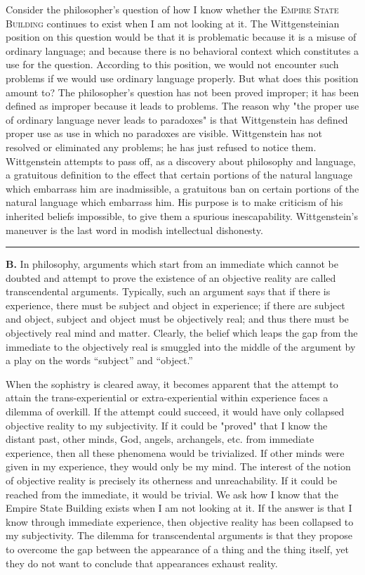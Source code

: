 \documentclass[10pt,twoside,draft]{memoir}
\newcommand{\gap}{\plainbreak{2}}
\begin{document}
Consider the philosopher's question of how I know whether the \textsc{Empire 
State Building} continues to exist when I am not looking at it. The 
Wittgensteinian position on this question would be that it is problematic 
because it is a misuse of ordinary language; and because there is no 
behavioral context which constitutes a use for the question. According to 
this position, we would not encounter such problems if we would use 
ordinary language properly. But what does this position amount to? The 
philosopher's question has not been proved improper; it has been defined as 
improper because it leads to problems. The reason why "the proper use of 
ordinary language never leads to paradoxes" is that Wittgenstein has defined 
proper use as use in which no paradoxes are visible. Wittgenstein has not 
resolved or eliminated any problems; he has just refused to notice them. 
Wittgenstein attempts to pass off, as a discovery about philosophy and 
language, a gratuitous definition to the effect that certain portions of the 
natural language which embarrass him are inadmissible, a gratuitous ban on 
certain portions of the natural language which embarrass him. His purpose is 
to make criticism of his inherited beliefs impossible, to give them a spurious 
inescapability. Wittgenstein's maneuver is the last word in modish 
intellectual dishonesty. 

\gap

\textbf{B.} In philosophy, arguments which start from an immediate which 
cannot be doubted and attempt to prove the existence of an objective reality 
are called transcendental arguments. Typically, such an argument says that if 
there is experience, there must be subject and object in experience; if there 
are subject and object, subject and object must be objectively real; and thus 
there must be objectively real mind and matter. Clearly, the belief which 
leaps the gap from the immediate to the objectively real is smuggled into the 
middle of the argument by a play on the words \enquote{subject} and \enquote{object.} 

When the sophistry is cleared away, it becomes apparent that the 
attempt to attain the trans-experiential or extra-experiential within 
experience faces a dilemma of overkill. If the attempt could succeed, it 
would have only collapsed objective reality to my subjectivity. If it could be 
"proved" that I know the distant past, other minds, God, angels, archangels, 
etc. from immediate experience, then all these phenomena would be 
trivialized. If other minds were given in my experience, they would only be 
my mind. The interest of the notion of objective reality is precisely its 
otherness and unreachability. If it could be reached from the immediate, it 
would be trivial. We ask how I know that the Empire State Building exists 
when I am not looking at it. If the answer is that I know through immediate 
experience, then objective reality has been collapsed to my subjectivity. The 
dilemma for transcendental arguments is that they propose to overcome the 
gap between the appearance of a thing and the thing itself, yet they do not 
want to conclude that appearances exhaust reality. 
\end{document}
